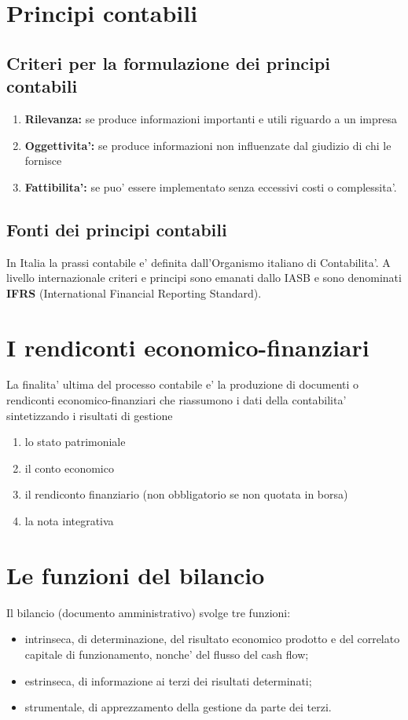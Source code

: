 \documentclass{report}
\begin{document}
	\section{Principi contabili}
	\subsection{Criteri per la formulazione dei principi contabili}
	\begin{enumerate}
		\item \textbf{Rilevanza:} se produce informazioni importanti e utili riguardo a un impresa
		\item \textbf{Oggettivita':} se produce informazioni non influenzate dal giudizio di chi le fornisce
		\item \textbf{Fattibilita':} se puo' essere implementato senza eccessivi costi o complessita'.
	\end{enumerate}
	\subsection{Fonti dei principi contabili}
	In Italia la prassi contabile e' definita dall'Organismo italiano di Contabilita'. A livello internazionale criteri e principi sono emanati dallo IASB e sono denominati \textbf{IFRS} (International Financial Reporting Standard).
	\section{I rendiconti economico-finanziari}
	La finalita' ultima del processo contabile e' la produzione di documenti o rendiconti economico-finanziari che riassumono i dati della contabilita' sintetizzando i risultati di gestione
	\begin{enumerate}
		\item lo stato patrimoniale
		\item il conto economico
		\item il rendiconto finanziario (non obbligatorio se non quotata in borsa)
		\item la nota integrativa
	\end{enumerate}
	\section{Le funzioni del bilancio}
	Il bilancio (documento amministrativo) svolge tre funzioni:
	\begin{itemize}
		\item intrinseca, di determinazione, del risultato economico prodotto e del correlato capitale di funzionamento, nonche' del flusso del cash flow;
		\item estrinseca, di informazione ai terzi dei risultati determinati;
		\item strumentale, di apprezzamento della gestione da parte dei terzi.
	\end{itemize}
\end{document}
